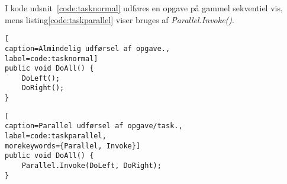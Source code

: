 I kode udsnit~\ref{code:tasknormal} udføres en opgave på gammel sekventiel vis, mens listing\ref{code:taskparallel} viser bruges af \textit{Parallel.Invoke()}.

\begin{lstlisting}[
caption=Almindelig udførsel af opgave.,
label=code:tasknormal]
public void DoAll() {
	DoLeft();
	DoRight();
}
\end{lstlisting}

\begin{lstlisting}[
caption=Parallel udførsel af opgave/task.,
label=code:taskparallel,
morekeywords={Parallel, Invoke}]
public void DoAll() {
	Parallel.Invoke(DoLeft, DoRight);
}
\end{lstlisting}

